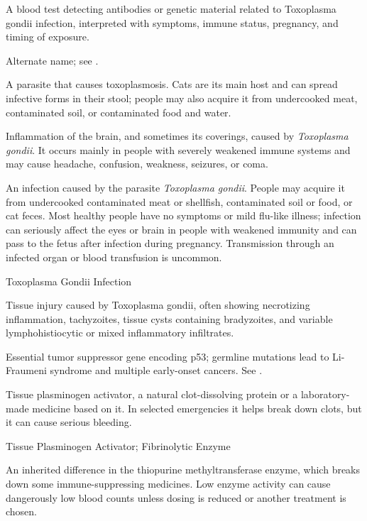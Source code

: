  A blood test detecting antibodies or genetic material related to Toxoplasma gondii infection, interpreted with symptoms, immune status, pregnancy, and timing of exposure.

 Alternate name; see .

 A parasite that causes toxoplasmosis. Cats are its main host and can spread infective forms in their stool; people may also acquire it from undercooked meat, contaminated soil, or contaminated food and water.

 Inflammation of the brain, and sometimes its coverings, caused by \textit{Toxoplasma gondii}. It occurs mainly in people with severely weakened immune systems and may cause headache, confusion, weakness, seizures, or coma.

 An infection caused by the parasite \textit{Toxoplasma gondii}. People may acquire it from undercooked contaminated meat or shellfish, contaminated soil or food, or cat feces. Most healthy people have no symptoms or mild flu-like illness; infection can seriously affect the eyes or brain in people with weakened immunity and can pass to the fetus after infection during pregnancy. Transmission through an infected organ or blood transfusion is uncommon.

\synonyms
Toxoplasma Gondii Infection

 Tissue injury caused by Toxoplasma gondii, often showing necrotizing inflammation, tachyzoites, tissue cysts containing bradyzoites, and variable lymphohistiocytic or mixed inflammatory infiltrates.

 Essential tumor suppressor gene encoding p53; germline mutations lead to Li-Fraumeni syndrome and multiple early-onset cancers. See .

 Tissue plasminogen activator, a natural clot-dissolving protein or a laboratory-made medicine based on it. In selected emergencies it helps break down clots, but it can cause serious bleeding.

\synonyms
Tissue Plasminogen Activator; Fibrinolytic Enzyme

 An inherited difference in the thiopurine methyltransferase enzyme, which breaks down some immune-suppressing medicines. Low enzyme activity can cause dangerously low blood counts unless dosing is reduced or another treatment is chosen.

